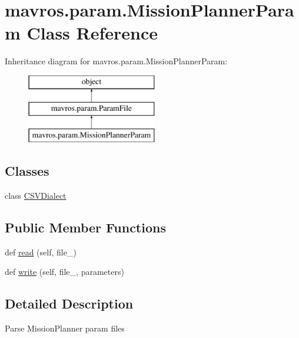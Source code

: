 \hypertarget{classmavros_1_1param_1_1MissionPlannerParam}{}\section{mavros.\+param.\+Mission\+Planner\+Param Class Reference}
\label{classmavros_1_1param_1_1MissionPlannerParam}
Inheritance diagram for mavros.\+param.\+Mission\+Planner\+Param\+:\begin{figure}[H]
\begin{center}
\leavevmode
\includegraphics[height=3.000000cm]{classmavros_1_1param_1_1MissionPlannerParam}
\end{center}
\end{figure}
\subsection*{Classes}
\begin{DoxyCompactItemize}
\item 
class \mbox{\hyperlink{classmavros_1_1param_1_1MissionPlannerParam_1_1CSVDialect}{C\+S\+V\+Dialect}}
\end{DoxyCompactItemize}
\subsection*{Public Member Functions}
\begin{DoxyCompactItemize}
\item 
def \mbox{\hyperlink{classmavros_1_1param_1_1MissionPlannerParam_a63149181028a5484884aebc70499ec97}{read}} (self, file\+\_\+)
\item 
def \mbox{\hyperlink{classmavros_1_1param_1_1MissionPlannerParam_accdcc5b51babb10e3212241d71587210}{write}} (self, file\+\_\+, parameters)
\end{DoxyCompactItemize}


\subsection{Detailed Description}
\begin{DoxyVerb}Parse MissionPlanner param files\end{DoxyVerb}
 

